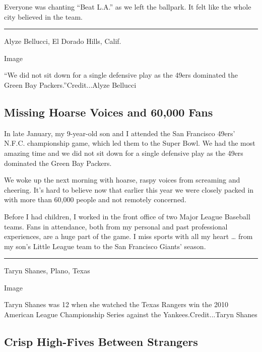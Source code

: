 Everyone was chanting ``Beat L.A.'' as we left the ballpark. It felt
like the whole city believed in the team.

\begin{center}\rule{0.5\linewidth}{\linethickness}\end{center}

Alyze Bellucci, El Dorado Hills, Calif.

Image

``We did not sit down for a single defensive play as the 49ers dominated
the Green Bay Packers.''Credit...Alyze Bellucci

\hypertarget{missing-hoarse-voices-and-60000-fans}{%
\subsection{Missing Hoarse Voices and 60,000
Fans}\label{missing-hoarse-voices-and-60000-fans}}

In late January, my 9-year-old son and I attended the San Francisco
49ers' N.F.C. championship game, which led them to the Super Bowl. We
had the most amazing time and we did not sit down for a single defensive
play as the 49ers dominated the Green Bay Packers.

We woke up the next morning with hoarse, raspy voices from screaming and
cheering. It's hard to believe now that earlier this year we were
closely packed in with more than 60,000 people and not remotely
concerned.

Before I had children, I worked in the front office of two Major League
Baseball teams. Fans in attendance, both from my personal and past
professional experiences, are a huge part of the game. I miss sports
with all my heart \ldots{} from my son's Little League team to the San
Francisco Giants' season.

\begin{center}\rule{0.5\linewidth}{\linethickness}\end{center}

Taryn Shanes, Plano, Texas

Image

Taryn Shanes was 12 when she watched the Texas Rangers win the 2010
American League Championship Series against the Yankees.Credit...Taryn
Shanes

\hypertarget{crisp-high-fives-between-strangers}{%
\subsection{Crisp High-Fives Between
Strangers}\label{crisp-high-fives-between-strangers}}

